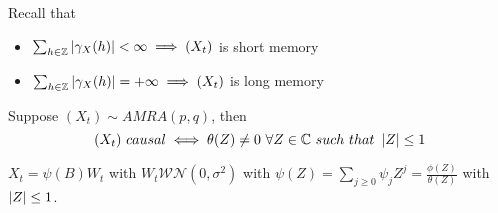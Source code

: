 Recall that
\begin{itemize}
    \item $\sum_{h\in\mathbb{Z}}\left|\gamma_X(h)\right|<\infty\implies(X_t)$ is short memory
    \item $\sum_{h\in\mathbb{Z}}\left|\gamma_X(h)\right|=+\infty\implies(X_t)$ is long memory
\end{itemize}

\begin{theorem}
    \label{theorem9}
    Suppose $(X_t)\sim AMRA(p,q)$, then
    \[
        (X_t)\ causal\iff\theta(Z)\ne0\ \forall Z\in\C\ such\ that\ \abs{Z}\le1  
    \]
\end{theorem}

\begin{corollary}
    $X_t=\psi(B)W_t$ with $W_t\mathcal{WN}(0,\sigma^2)$ with $\psi(Z)=\sum_{j\ge0}\psi_jZ^j=\frac{\phi(Z)}{\theta(Z)}$ with $\left|Z\right|\le1$.
\end{corollary}

